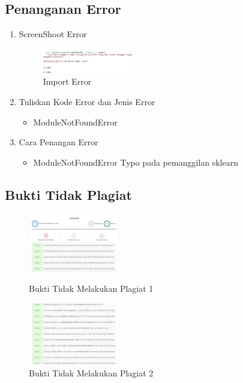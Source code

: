\subsection{Penanganan Error}
\begin{enumerate}
\item ScreenShoot Error
\begin{figure}[H]
	\includegraphics[width=4cm]{figures/1174056/1/error/1.JPG}
	\centering
	\caption{Import Error}
\end{figure}
\item Tuliskan Kode Error dan Jenis Error
\begin{itemize}
	\item ModuleNotFoundError
\end{itemize}
\item Cara Penangan Error
\begin{itemize}
	\item ModuleNotFoundError
	\hfill\break
	Typo pada pemanggilan sklearn
\end{itemize}
\end{enumerate}
\subsection{Bukti Tidak Plagiat}
\begin{figure}[H]
\includegraphics[width=4cm]{figures/1174056/1/plagiat/1.JPG}
\centering
\caption{Bukti Tidak Melakukan Plagiat 1}
\includegraphics[width=4cm]{figures/1174056/1/plagiat/2.JPG}
\centering
\caption{Bukti Tidak Melakukan Plagiat 2}
\end{figure}